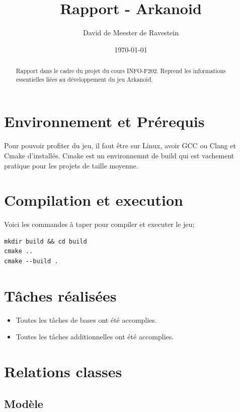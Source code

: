 \documentclass{article}
\title{Rapport - Arkanoid}
\author{David de Meester de Ravestein}
\date{\today}
\begin{document}
\maketitle

\begin{abstract}
Rapport dans le cadre du projet du cours INFO-F202. Reprend les informations essentielles liées au développement du jeu Arkanoid.
\end{abstract}

\tableofcontents

\newpage

\section{Environnement et Prérequis}

Pour pouvoir profiter du jeu, il faut être sur Linux, avoir GCC ou Clang et Cmake d'installés. Cmake est un environnemnt de build qui est vachement pratique pour les projets de taille moyenne.

\section{Compilation et execution}

Voici les commandes à taper pour compiler et executer le jeu;
\begin{verbatim}
mkdir build && cd build
cmake ..
cmake --build .
\end{verbatim}

\section{Tâches réalisées}

\begin{itemize}
	\item Toutes les tâches de bases ont été accomplies.
	\item Toutes les tâches additionnelles ont été accomplies.
\end{itemize}

\section{Relations classes}

\subsection{Modèle}
\end{document}
